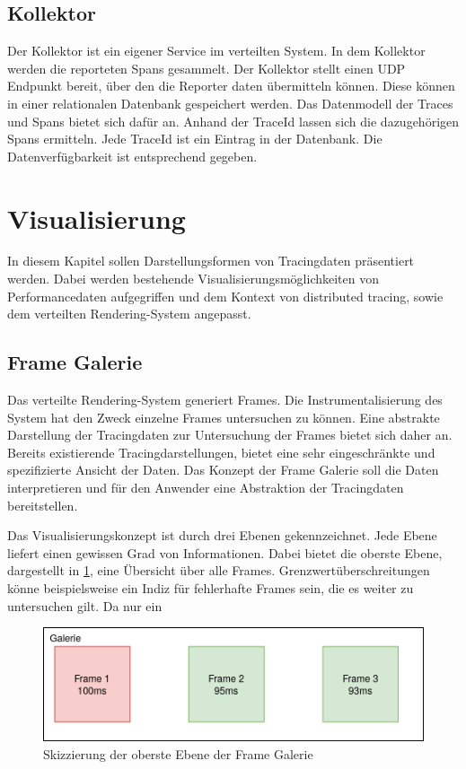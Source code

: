 \subsection{Kollektor}
\label{subsection:Kollektor}
Der Kollektor ist ein eigener Service im verteilten System. In dem Kollektor werden die reporteten Spans gesammelt. Der Kollektor stellt einen UDP Endpunkt bereit, über den die Reporter daten übermitteln können. Diese können in einer relationalen Datenbank gespeichert werden. Das Datenmodell der Traces und Spans bietet sich dafür an. Anhand der TraceId lassen sich die dazugehörigen Spans ermitteln. Jede TraceId ist ein Eintrag in der Datenbank. Die Datenverfügbarkeit ist entsprechend gegeben.  

\section{Visualisierung}
\label{section:Visualisierung}
In diesem Kapitel sollen Darstellungsformen von Tracingdaten präsentiert werden. Dabei werden bestehende Visualisierungsmöglichkeiten von Performancedaten aufgegriffen und dem Kontext von distributed tracing, sowie dem verteilten Rendering-System angepasst.


\subsection{Frame Galerie}

Das verteilte Rendering-System generiert Frames. Die Instrumentalisierung des System hat den Zweck einzelne Frames untersuchen zu können. Eine abstrakte Darstellung der Tracingdaten zur Untersuchung der Frames bietet sich daher an. Bereits existierende Tracingdarstellungen, bietet eine sehr eingeschränkte und spezifizierte Ansicht der Daten. Das Konzept der Frame Galerie soll die Daten interpretieren und für den Anwender eine Abstraktion der Tracingdaten bereitstellen. 

Das Visualisierungskonzept ist durch drei Ebenen gekennzeichnet. Jede Ebene liefert einen gewissen Grad von Informationen. Dabei bietet die oberste Ebene, dargestellt in \cref{fig:FrameGalerieObereEbene}, eine Übersicht über alle Frames. Grenzwertüberschreitungen könne beispielsweise ein Indiz für fehlerhafte Frames sein, die es weiter zu untersuchen gilt. Da nur ein 

\begin{figure}[!ht]
	\centering
	\includegraphics[scale=0.8]{img/Design/FrameGalerieObereEbene.png}
	\caption[Oberste Ebene der Frame Galerie]{ Skizzierung der oberste Ebene der Frame Galerie}
	\label{fig:FrameGalerieObereEbene}
\end{figure}

